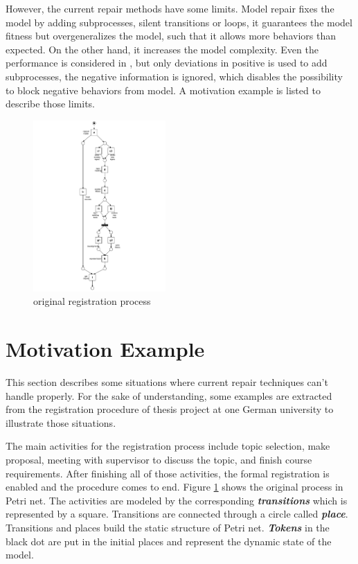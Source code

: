 However, the current repair methods have some limits. Model repair fixes the model by adding subprocesses, silent transitions or loops, it guarantees the model fitness but overgeneralizes the model, such that it allows more behaviors than expected. On the other hand, it increases the model complexity.  Even the performance is considered in \cite{dees2017enhancing}, but only deviations in positive is used to add subprocesses, the negative information is ignored, which disables the possibility to block negative behaviors from model.  A motivation example is listed to describe those limits.
\begin{figure}
	\centering
	\includegraphics[clip, trim=7cm 0cm 7cm 0cm, width=0.45\textwidth, height=0.7\textheight]{figures/introduction/Master-original-model.pdf}
	\caption{original registration process}
	\label{fig:model_a}
\end{figure}
\section{Motivation Example}
This section describes some situations where current repair techniques can't handle properly. For the sake of understanding, some examples are extracted from the registration procedure of thesis project at one German university to illustrate those situations.

The main activities for the registration process include topic selection, make proposal, meeting with supervisor to discuss the topic, and finish course requirements. After finishing all of those activities, the formal registration is enabled and the procedure comes to end. Figure \ref{fig:model_a}  shows the original process in Petri net. The activities are modeled by the corresponding \textbf{\emph{transitions}} which is represented by a square. Transitions are connected through a circle called \textbf{\emph{place}}. Transitions and places build the static structure of Petri net. \textbf{\emph{Tokens}} in the black dot are put in the initial places and represent the dynamic state of the model. 

